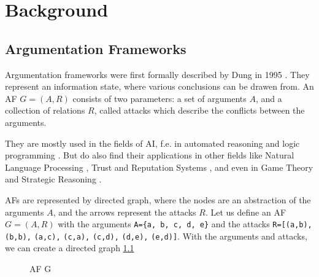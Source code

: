 \chapter{Background}

\section{Argumentation Frameworks}


Argumentation frameworks were first formally described by Dung in 1995 \cite{DUNG1995321}. They represent an information state, where various conclusions can be drawen from. An AF $G = (A, R)$ consists of two parameters: a set of arguments $A$, and a collection of relations $R$, called attacks which describe the conflicts between the arguments.

They are mostly used in the fields of \ac{AI}, f.e. in automated reasoning and logic programming \cite{AFINAIARLP, AFINAIARLPexample}. But do also find their applications in other fields like Natural Language Processing \cite{AFINNLP}, Trust and Reputation Systems \cite{AFINTaRS}, and even in Game Theory and Strategic Reasoning \cite{AFinGames}.

AFs are represented by directed graph, where the nodes are an abstraction of the arguments $A$, and the arrows represent the attacks $R$. Let us define an AF $G = (A, R)$ with the arguments 
\texttt{A=\{a, b, c, d, e\}} and the attacks 
\texttt{R=[(a,b),}
\texttt{(b,b),}
\texttt{(a,c),}
\texttt{(c,a),}
\texttt{(c,d),}
\texttt{(d,e),}
\texttt{(e,d)]}. With the arguments and attacks, we can create a directed graph \ref{af:backgroundAFexample1}
\begin{figure}[h]
    \centering
    \caption{\ac{AF} G}
    \label{af:backgroundAFexample1}
\end{figure}

